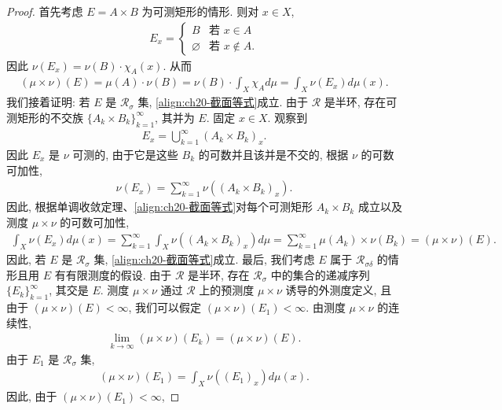 \documentclass[../../main.tex]{subfiles}
\begin{document}
\begin{proof}
首先考虑 $E=A\times B$ 为可测矩形的情形. 则对 $x\in X$,
\begin{align*}
E_{x}=\begin{cases}B&\text{若 }x\in A\\\varnothing&\text{若 }x\notin A.\end{cases}
\end{align*}
因此 $\nu(E_{x})=\nu(B)\cdot\chi_{A}(x)$. 从而
\begin{align*}
(\mu\times\nu)(E)=\mu(A)\cdot\nu(B)=\nu(B)\cdot\int_{X}\chi_{A}d\mu=\int_{X}\nu(E_{x})d\mu(x).
\end{align*}
我们接着证明: 若 $E$ 是 $\mathcal{R}_{\sigma}$ 集, \eqref{align:ch20-截面等式}成立. 由于 $\mathcal{R}$ 是半环, 存在可测矩形的不交族 $\{A_{k}\times B_{k}\}_{k=1}^{\infty}$, 其并为 $E$. 固定 $x\in X$. 观察到
\begin{align*}
E_{x}=\bigcup_{k=1}^{\infty}(A_{k}\times B_{k})_{x}.
\end{align*}
因此 $E_{x}$ 是 $\nu$ 可测的, 由于它是这些 $B_{k}$ 的可数并且该并是不交的, 根据 $\nu$ 的可数可加性,
\begin{align*}
\nu(E_{x})=\sum_{k=1}^{\infty}\nu((A_{k}\times B_{k})_{x}).
\end{align*}
因此, 根据单调收敛定理、\eqref{align:ch20-截面等式}对每个可测矩形 $A_{k}\times B_{k}$ 成立以及测度 $\mu\times\nu$ 的可数可加性,
\begin{align*}
\int_{X}\nu(E_{x})d\mu(x)=\sum_{k=1}^{\infty}\int_{X}\nu((A_{k}\times B_{k})_{x})d\mu=\sum_{k=1}^{\infty}\mu(A_{k})\times\nu(B_{k})=(\mu\times\nu)(E).
\end{align*}
因此, 若 $E$ 是 $\mathcal{R}_{\sigma}$ 集, \eqref{align:ch20-截面等式}成立. 最后, 我们考虑 $E$ 属于 $\mathcal{R}_{\sigma\delta}$ 的情形且用 $E$ 有有限测度的假设. 由于 $\mathcal{R}$ 是半环, 存在 $\mathcal{R}_{\sigma}$ 中的集合的递减序列 $\{E_{k}\}_{k=1}^{\infty}$, 其交是 $E$. 测度 $\mu\times\nu$ 通过 $\mathcal{R}$ 上的预测度 $\mu\times\nu$ 诱导的外测度定义, 且由于 $(\mu\times\nu)(E)<\infty$, 我们可以假定 $(\mu\times\nu)(E_{1})<\infty$. 由测度 $\mu\times\nu$ 的连续性,
\begin{align}\label{align:ch20-测度连续}
\lim_{k\to\infty}(\mu\times\nu)(E_{k})=(\mu\times\nu)(E).
\end{align}
由于 $E_{1}$ 是 $\mathcal{R}_{\sigma}$ 集,
\begin{align*}
(\mu\times\nu)(E_{1})=\int_{X}\nu((E_{1})_{x})d\mu(x).
\end{align*}
因此, 由于 $(\mu\times\nu)(E_{1})<\infty$,

\end{proof}
\end{document}
